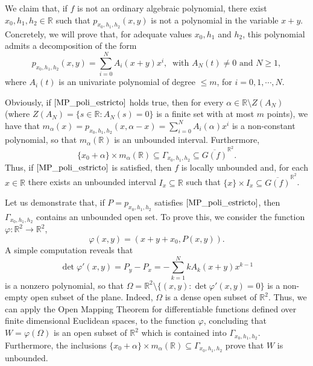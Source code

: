 \documentclass[10pt,a4paper]{amsart}
\theoremstyle{definition}
\begin{document}
We claim that, if  $f$ is not an ordinary algebraic polynomial, there exist $x_0,h_1,h_2\in\mathbb{R}$ such that  $p_{x_0,h_1,h_2}(x,y)$ is not a polynomial in the variable $x+y$. Concretely, we will prove that, for adequate values $x_0,h_1$ and $h_2$, this polynomial admits a decomposition of the form
\begin{equation}\label{MP_poli_estricto}
p_{x_0,h_1,h_2}(x,y)=\sum_{i=0}^NA_i(x+y)x^i,\ \text{ with } A_N(t)\neq 0 \text{ and } N\geq 1,
\end{equation}
where $A_i(t)$ is an univariate polynomial of degree $\leq m$, for  $i=0,1,\cdots,N$.  

Obviously, if  $\eqref{MP_poli_estricto}$ holds true, then for every $\alpha\in\mathbb{R}\setminus Z(A_N)$ (where $Z(A_N)=\{s\in\mathbb{R}:A_N(s)=0\}$ is a finite set with at most $m$ points), we have that  $m_{\alpha}(x)=p_{x_0,h_1,h_2}(x,\alpha-x)=\sum_{i=0}^NA_i(\alpha)x^i$ is a non-constant polynomial, so that  $m_{\alpha}(\mathbb{R})$ is an unbounded interval.  Furthermore,
\[
\{x_0+\alpha\}\times m_{\alpha}(\mathbb{R})\subseteq \Gamma_{x_0,h_1,h_2}\subseteq \overline{G(f)}^{\mathbb{R}^2}.
\]
Thus, if  $\eqref{MP_poli_estricto}$ is satisfied, then  $f$ is locally unbounded and, for each  $x\in\mathbb{R}$ there exists an unbounded interval $I_x\subseteq \mathbb{R}$ such that 
$\{x\}\times I_x\subseteq  \overline{G(f)}^{\mathbb{R}^2}$. 

Let us demonstrate that, if $P=p_{x_0,h_1,h_2}$ satisfies  $\eqref{MP_poli_estricto}$, then  $\Gamma_{x_0,h_1,h_2}$ contains an unbounded  open set. To prove this, we consider the function  $\varphi:\mathbb{R}^2\to\mathbb{R}^2$, 
$$\varphi(x,y)=(x+y+x_0,P(x,y)).$$ 
A simple computation reveals that   $$\det \varphi'(x,y)=P_y-P_x=-\sum_{k=1}^NkA_k(x+y)x^{k-1}$$ is a nonzero polynomial, so that 
 $\Omega=\mathbb{R}^2\setminus \{(x,y): \det \varphi'(x,y)=0\}$ is a non-empty open subset of the plane. Indeed, $\Omega$ is a dense open subset of $\mathbb{R}^2$. Thus, we can apply the Open Mapping Theorem for differentiable functions defined over finite dimensional Euclidean spaces, to the function  $\varphi$, concluding that  $W=\varphi(\Omega)$ is an open subset of  $\mathbb{R}^2$ which is contained into $\Gamma_{x_0,h_1,h_2}$. Furthermore, the inclusions  $\{x_0+\alpha\}\times m_{\alpha}(\mathbb{R})\subseteq \Gamma_{x_0,h_1,h_2}$ prove that $W$ is unbounded. 
\end{document}

